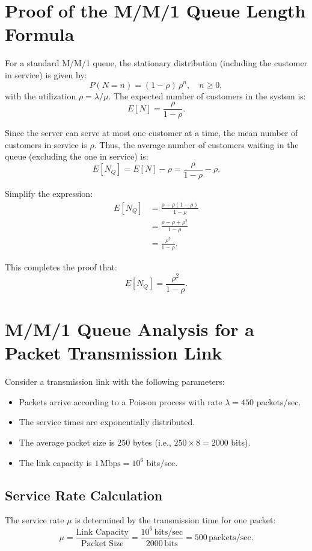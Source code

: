 \documentclass[12pt]{article}
\begin{document}
\section{Proof of the M/M/1 Queue Length Formula}

For a standard M/M/1 queue, the stationary distribution (including the customer in service) is given by:
\[
P(N = n) = (1-\rho)\,\rho^n, \quad n \ge 0,
\]
with the utilization \(\rho = \lambda/\mu\). The expected number of customers in the system is:
\[
E[N] = \frac{\rho}{1-\rho}.
\]

Since the server can serve at most one customer at a time, the mean number of customers in service is \(\rho\). Thus, the average number of customers waiting in the queue (excluding the one in service) is:
\[
E[N_Q] = E[N] - \rho = \frac{\rho}{1-\rho} - \rho.
\]

Simplify the expression:
\begin{align*}
E[N_Q] &= \frac{\rho - \rho(1-\rho)}{1-\rho} \\
       &= \frac{\rho - \rho + \rho^2}{1-\rho} \\
       &= \frac{\rho^2}{1-\rho}.
\end{align*}

This completes the proof that:
\[
E[N_Q] = \frac{\rho^2}{1-\rho}.
\]

\section{M/M/1 Queue Analysis for a Packet Transmission Link}

Consider a transmission link with the following parameters:
\begin{itemize}
    \item Packets arrive according to a Poisson process with rate \(\lambda = 450\) packets/sec.
    \item The service times are exponentially distributed.
    \item The average packet size is 250 bytes (i.e., \(250 \times 8 = 2000\) bits).
    \item The link capacity is \(1\,\text{Mbps} = 10^6\) bits/sec.
\end{itemize}

\subsection*{Service Rate Calculation}
The service rate \(\mu\) is determined by the transmission time for one packet:
\[
\mu = \frac{\text{Link Capacity}}{\text{Packet Size}} = \frac{10^6\,\text{bits/sec}}{2000\,\text{bits}} = 500\,\text{packets/sec}.
\]
\end{document}
